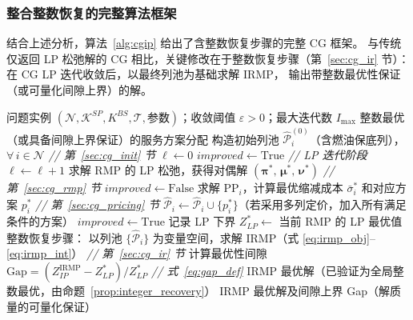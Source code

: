 \documentclass[UTF8, a4paper, 12pt]{ctexart}
\theoremstyle{plain}
\theoremstyle{definition}
\theoremstyle{remark}
\begin{document}
\subsubsection{整合整数恢复的完整算法框架}
\label{sec:cg_algorithm_full}

结合上述分析，算法~\ref{alg:cgip} 给出了含整数恢复步骤的完整 CG 框架。
与传统仅返回 LP 松弛解的 CG 相比，关键修改在于整数恢复步骤（第~\ref{sec:cg_ir} 节）：
在 CG LP 迭代收敛后，以最终列池为基础求解 IRMP，
输出带整数最优性保证（或可量化间隙上界）的解。

\begin{algorithm}[htbp]
\caption{含整数恢复的列生成求解框架（CG 与 IR）}
\label{alg:cgip}
\begin{algorithmic}[1]
\REQUIRE 问题实例 $(\mathcal{N}, \mathcal{K}^{SP}, K^{BS}, \mathcal{T},
  \text{参数})$；收敛阈值 $\varepsilon > 0$；最大迭代数 $I_{\max}$
\ENSURE 整数最优（或具备间隙上界保证）的服务方案分配
\STATE 构造初始列池 $\hat{\mathcal{P}}_i^{(0)}$（含燃油保底列），$\forall\, i \in \mathcal{N}$
  \hfill \textit{// 第~\ref{sec:cg_init} 节}
\STATE $\ell \leftarrow 0$
\STATE $\textit{improved} \leftarrow \mathrm{True}$
  \STATE \textit{// LP 迭代阶段}
  \STATE $\ell \leftarrow \ell + 1$
  \STATE 求解 RMP 的 LP 松弛，获得对偶解
    $(\boldsymbol{\pi}^*,\, \boldsymbol{\mu}^*,\, \boldsymbol{\nu}^*)$
    \hfill \textit{// 第~\ref{sec:cg_rmp} 节}
  \STATE $\textit{improved} \leftarrow \mathrm{False}$
    \STATE 求解 $\text{PP}_i$，计算最优缩减成本 $\bar{\sigma}_i^*$ 和对应方案 $p_i^*$
      \hfill \textit{// 第~\ref{sec:cg_pricing} 节}
      \STATE $\hat{\mathcal{P}}_i \leftarrow \hat{\mathcal{P}}_i \cup \{p_i^*\}$（若采用多列定价，加入所有满足条件的方案）
      \STATE $\textit{improved} \leftarrow \mathrm{True}$
    \ENDIF
  \ENDFOR
\ENDWHILE
\STATE 记录 LP 下界 $Z_{LP}^* \leftarrow$ 当前 RMP 的 LP 最优值
\STATE 整数恢复步骤： 以列池 $\{\hat{\mathcal{P}}_i\}$ 为变量空间，求解 IRMP（式
  \eqref{eq:irmp_obj}--\eqref{eq:irmp_int}）
  \hfill \textit{// 第~\ref{sec:cg_ir} 节}
\STATE 计算最优性间隙 $\text{Gap} = (Z_{IP}^{\text{IRMP}} - Z_{LP}^*) / Z_{LP}^*$
  \hfill \textit{// 式~\eqref{eq:gap_def}}
  \RETURN IRMP 最优解（已验证为全局整数最优，由命题~\ref{prop:integer_recovery}）
\ELSE
  \RETURN IRMP 最优解及间隙上界 Gap（解质量的可量化保证）
\ENDIF
\end{algorithmic}
\end{algorithm}
\end{document}
